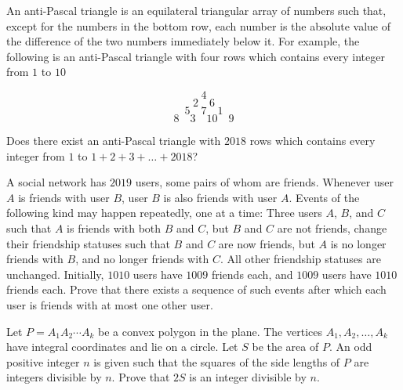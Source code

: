 



\renewcommand{\theenumi}{\alph{enumi}}



\noindent
 
\filbreak

\begin{problem}
[IMO2018PL3]
An anti-Pascal triangle is an equilateral triangular array of numbers such that, except for the numbers in the bottom row, each number is the absolute value of the difference of the two numbers immediately below it. For example, the following is an anti-Pascal triangle with four rows which contains every integer from $1$ to $10$

\[4\]
\[2\quad 6\]
\[5\quad 7 \quad 1\]
\[8\quad 3 \quad 10 \quad 9\]

Does there exist an anti-Pascal triangle with $2018$ rows which contains every integer from $1$ to $1 + 2 + 3 + \dots + 2018$?
\end{problem}


\begin{problem}
[IMO2019PL3]
A social network has $2019$ users, some pairs of whom are friends. Whenever user $A$ is friends with user $B$, user $B$ is also friends with user $A$. Events of the following kind may happen repeatedly, one at a time: Three users $A$, $B$, and $C$ such that $A$ is friends with both $B$ and $C$, but $B$ and $C$ are not friends, change their friendship statuses such that $B$ and $C$ are now friends, but $A$ is no longer friends with $B$, and no longer friends with $C$. All other friendship statuses are unchanged. Initially, $1010$ users have $1009$ friends each, and $1009$ users have $1010$ friends each. Prove that there exists a sequence of such events after which each user is friends with at most one other user.
\end{problem}

\begin{problem}
[IMO2016PL3]
Let $P = A_1A_2 \cdots A_k$ be a convex polygon in the plane. The vertices $A_1,A_2,\dots, A_k$ have integral coordinates and lie on a circle. Let $S$ be the area of $P$. An odd positive integer $n$ is given such that the squares of the side lengths of $P$ are integers divisible by $n$. Prove that $2S$ is an integer divisible by $n$.
\end{problem}

